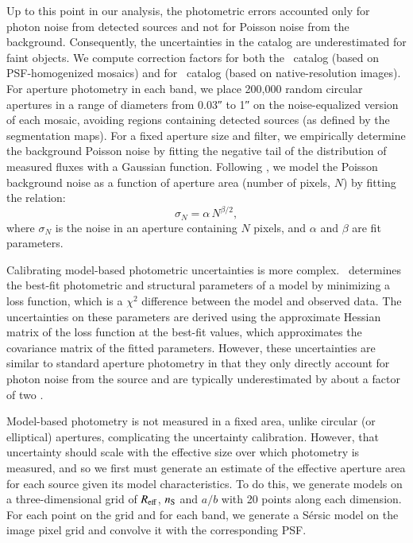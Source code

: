 \documentclass[longauth]{aa}
\begin{document}
Up to this point in our analysis, the photometric errors accounted only for photon noise from detected sources and not for Poisson noise from the background. Consequently, the uncertainties in the catalog are underestimated for faint objects. We compute correction factors for both the \hotcold\ catalog (based on PSF-homogenized mosaics) and for \SEpp\ catalog (based on native-resolution images). For aperture photometry in each band, we place 200,000 random circular apertures in a range of diameters from \ang{;;0.03} to \ang{;;1} on the noise-equalized version of each mosaic, avoiding regions containing detected sources (as defined by the segmentation maps). For a fixed aperture size and filter, we empirically determine the background Poisson noise by fitting the negative tail of the distribution of measured fluxes with a Gaussian function. Following \citet{Labbe2003, Gawiser2006, Whitaker2011, Skelton2014, Rieke2023, Finkelstein2024}, we model the Poisson background noise as a function of aperture area (number of pixels, $N$) by fitting the relation:
\begin{equation}
\sigma_N = \alpha \, N^{\beta/2},
\end{equation}
where $\sigma_N$ is the noise in an aperture containing $N$ pixels, and $\alpha$ and $\beta$ are fit parameters.


Calibrating model-based photometric uncertainties is  more complex. \SEpp\ determines the best-fit photometric and structural parameters of a model by minimizing a loss function, which is a $\chi^2$ difference between the model and observed data. The uncertainties on these parameters are derived using the approximate Hessian matrix of the loss function at the best-fit values, which approximates the covariance matrix of the fitted parameters. However, these uncertainties are similar to standard aperture photometry in that they only directly account for photon noise from the source and are typically underestimated by about a factor of two \citep{HubertEMC2022, MerlinEMC2022}. 

Model-based photometry is not measured in a fixed area, unlike circular (or elliptical) apertures, complicating the uncertainty calibration. However, that uncertainty should scale with the effective size over which photometry is measured, and so we first must generate an estimate of the effective aperture area for each source given its model characteristics.
To do this, we generate models on a three-dimensional grid of $R_{\rm eff}$, $n_{\rm S}$ and $a/b$ with 20 points along each dimension. For each point on the grid and for each band, we generate a Sérsic model on the image pixel grid and convolve it with the corresponding PSF. 
\end{document}
